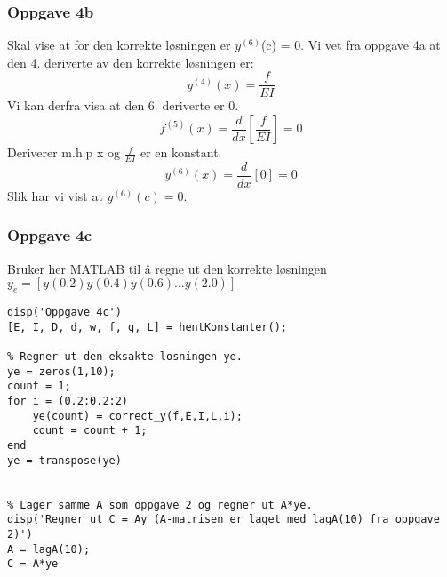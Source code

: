 \subsubsection{Oppgave 4b}
Skal vise at for den korrekte løsningen er $y^{(6)}$(c) = 0. Vi vet fra oppgave 4a at den 4. deriverte av den korrekte løsningen er:
\begin{equation*}
y^{(4)}(x) = \frac{f}{EI}
\end{equation*}
Vi kan derfra visa at den 6. deriverte er 0.
\begin{equation}
f^{(5)}(x) = \frac{d}{dx}[\frac{f}{EI}] = 0
\end{equation}
Deriverer m.h.p x og $\frac{f}{EI}$ er en konstant.
\begin{equation}
y^{(6)}(x) = \frac{d}{dx}[0] = 0
\end{equation}
Slik har vi vist at $y^{(6)}(c) = 0$.

\subsubsection{Oppgave 4c}
Bruker her MATLAB til å regne ut den korrekte løsningen $y_e = [y(0.2) y(0.4) y(0.6) ... y(2.0)]$ 
\begin{lstlisting}
disp('Oppgave 4c')
[E, I, D, d, w, f, g, L] = hentKonstanter();

% Regner ut den eksakte losningen ye.
ye = zeros(1,10);
count = 1;
for i = (0.2:0.2:2)
    ye(count) = correct_y(f,E,I,L,i);
    count = count + 1;
end
ye = transpose(ye)


% Lager samme A som oppgave 2 og regner ut A*ye.
disp('Regner ut C = Ay (A-matrisen er laget med lagA(10) fra oppgave 2)')
A = lagA(10);
C = A*ye
\end{lstlisting}
